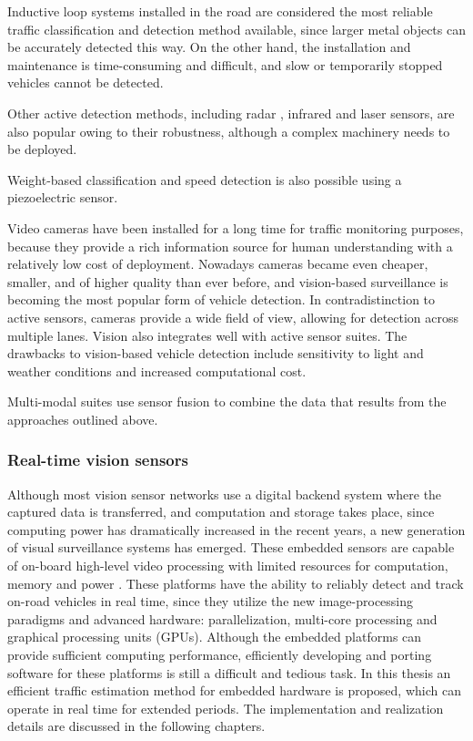 Inductive loop systems installed in the road are considered the most reliable traffic classification and detection method available, since larger metal objects can be accurately detected this way. 
On the other hand, the installation and maintenance is time-consuming and difficult, and slow or temporarily stopped vehicles cannot be detected\cite{Diamond, Zhang2016}.

Other active detection methods, including radar \cite{DeepBlue}, infrared\cite{Swarco, Hussain1995, Ghazal2016} and laser\cite{SICK, Gallego2009} sensors, are also popular owing to their robustness, although a complex machinery needs to be deployed.

Weight-based classification and speed detection is also possible using a piezoelectric sensor\cite{Te, Rivas2017}.

Video cameras have been installed for a long time for traffic monitoring purposes, because they provide a rich information source for human understanding with a relatively low cost of deployment\cite{Tian2011, Buch2011, VideoSurveillance, LaSemaforica}.
Nowadays cameras became even cheaper, smaller, and of higher quality than ever before, and vision-based surveillance is becoming the most popular form of vehicle detection.
In contradistinction to active sensors, cameras provide a wide field of view, allowing for detection across multiple lanes. 
Vision also integrates well with active sensor suites\cite{Garcia2012}.
The drawbacks to vision-based vehicle detection include sensitivity to light and weather conditions and increased computational cost\cite{Sivaraman2013}.

Multi-modal suites use sensor fusion to combine the data that results from the approaches outlined above\cite{Swarco}.

\subsubsection{Real-time vision sensors}
Although most vision sensor networks use a digital backend system where the captured data is transferred, and computation and storage takes place, since computing power has dramatically increased in the recent years, a new generation of visual surveillance systems has emerged.
These embedded sensors are capable of on-board high-level video processing with limited resources for computation, memory and power \cite{Bramberger2004}.
These platforms have the ability to reliably detect and track on-road vehicles in real time, since they utilize the new image-processing paradigms and advanced hardware: parallelization, multi-core processing and graphical processing units (GPUs)\cite{Sivaraman2013}.
Although the embedded platforms can provide sufficient computing performance, efficiently developing and porting software for these platforms is still a difficult and tedious task\cite{Bramberger2004}.
In this thesis an efficient traffic estimation method for embedded hardware is proposed, which can operate in real time for extended periods.
The implementation and realization details are discussed in the following chapters.

